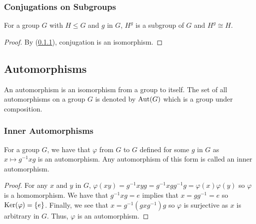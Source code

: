 \subsubsection{Conjugations on Subgroups} \label{2.10}

For a group $G$ with $H \leq G$ and $g$ in $G$, $H^g$ is a subgroup of
$G$ and $H^g \cong H$.

\begin{proof}
    By (\ref{2.9}), conjugation is an isomorphism.
\end{proof}

\subsection{Automorphisms}

An automorphism is an isomorphism from a group to itself. The set of
all automorphisms on a group $G$ is denoted by $\operatorname{Aut}(G)$ which
is a group under composition.

\subsubsection{Inner Automorphisms} \label{2.9}

For a group $G$, we have that $\varphi$ from $G$ to $G$ defined for some $g$ in $G$ 
as $x \mapsto g^{-1}xg$ is an automorphism. Any automorphism of this
form is called an inner automorphism.

\begin{proof}
    For any $x$ and $y$ in $G$, 
    $\varphi(xy) = g^{-1}xyg = g^{-1}xgg^{-1}g = \varphi(x)\varphi(y)$
    so $\varphi$ is a homomorphism. We have that 
    $g^{-1}xg = e$ implies that $x = gg^{-1} = e$ so 
    $\operatorname{Ker}(\varphi) = \{e\}$. Finally, we see that $x = g^{-1}(gxg^{-1})g$
    so $\varphi$ is surjective as $x$ is arbitrary in $G$. 
    Thus, $\varphi$ is an automorphism.
\end{proof}
